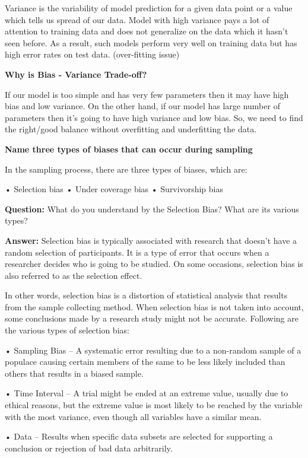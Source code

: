 \documentclass[
]{book}
\begin{document}
Variance is the variability of model prediction for a given data point or a value which tells us spread of our data. Model with high variance pays a lot of attention to training data and does not generalize on the data which it hasn't seen before. As a result, such models perform very well on training data but has high error rates on test data. (over-fitting issue)

\textbf{Why is Bias - Variance Trade-off?}

If our model is too simple and has very few parameters then it may have high bias and low variance. On the other hand, if our model has large number of parameters then it's going to have high variance and low bias. So, we need to find the right/good balance without overfitting and underfitting the data.

\textbf{Name three types of biases that can occur during sampling}

In the sampling process, there are three types of biases, which are:

• Selection bias
• Under coverage bias
• Survivorship bias

\textbf{Question:} What do you understand by the Selection Bias? What are its various types?

\textbf{Answer:} Selection bias is typically associated with research that doesn't have a random selection of participants. It is a type of error that occurs when a researcher decides who is going to be studied. On some occasions, selection bias is also referred to as the selection effect.

In other words, selection bias is a distortion of statistical analysis that results from the sample collecting method. When selection bias is not taken into account, some conclusions made by a research study might not be accurate. Following are the various types of selection bias:

• Sampling Bias -- A systematic error resulting due to a non-random sample of a populace causing certain members of the same to be less likely included than others that results in a biased sample.

• Time Interval -- A trial might be ended at an extreme value, usually due to ethical reasons, but the extreme value is most likely to be reached by the variable with the most variance, even though all variables have a similar mean.

• Data -- Results when specific data subsets are selected for supporting a conclusion or rejection of bad data arbitrarily.
\end{document}

